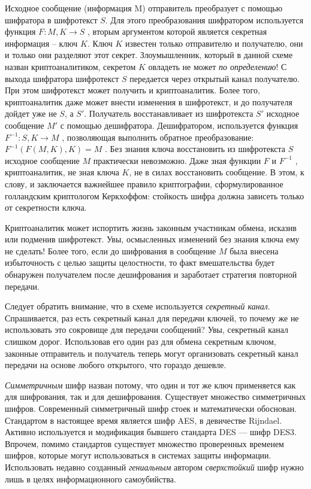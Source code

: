 Исходное сообщение (информация M) отправитель преобразует с помощью шифратора в шифротекст $S$. Для этого преобразования шифратором используется функция $F:M,K\rightarrow S$ , вторым аргументом которой является секретная информация – ключ $K$. Ключ $K$ известен только отправителю и получателю, они и только они  разделяют этот секрет. Злоумышленник, который в данной схеме назван криптоаналитиком, секретом $K$ овладеть не может \emph{по определению}! С выхода шифратора шифротекст $S$ передается через открытый канал получателю. При этом шифротекст может получить и криптоаналитик. Более того, криптоаналитик даже может внести изменения в шифротекст, и до получателя дойдет уже не $S$, а $S'$.  Получатель  восстанавливает из шифротекста $S'$ исходное сообщение $M'$ с помощью дешифратора. Дешифратором, используется функция $F^{-1}:S,K\rightarrow M$ , позволяющая выполнить обратное преобразование: $F^{-1}(F(M,K),K)=M$ . Без знания ключа восстановить из шифротекста $S$ исходное сообщение $M$ практически невозможно. Даже зная функции $F$  и $F^{-1}$ , криптоаналитик, не зная ключа $K$, не в силах восстановить сообщение. В этом, к слову, и заключается важнейшее правило криптографии, сформулированное голландским криптологом Керкхоффом: стойкость шифра должна зависеть только от секретности ключа.

Криптоаналитик может испортить жизнь законным участникам обмена, исказив или подменив шифротекст. Увы, осмысленных изменений без знания ключа ему не сделать! Более того, если до шифрования в сообщение $M$ была внесена избыточность с целью защиты целостности, то факт вмешательства будет обнаружен получателем после дешифрования и заработает стратегия повторной передачи.

Следует обратить внимание, что в схеме используется \emph{секретный канал}. Спрашивается, раз есть секретный канал для передачи ключей, то почему же не использовать это сокровище для передачи сообщений? Увы, секретный канал слишком дорог. Использовав его один раз для обмена секретным ключом, законные отправитель и получатель теперь могут организовать секретный канал передачи на основе любого открытого, что гораздо дешевле.

\emph{Симметричным} шифр назван потому, что один и тот же ключ применяется как для шифрования, так и для дешифрования.
Существует множество симметричных шифров. Современный симметричный шифр стоек и математически обоснован. Стандартом в настоящее время является шифр AES, в девичестве Rijndael. Активно используется и модификация бывшего стандарта DES --- шифр DES3. Впрочем, помимо стандартов существует множество проверенных временем шифров, которые могут использоваться в системах защиты информации. Использовать недавно созданный \emph{гениальным} автором \emph{сверхстойкий} шифр нужно лишь в целях информационного самоубийства.



